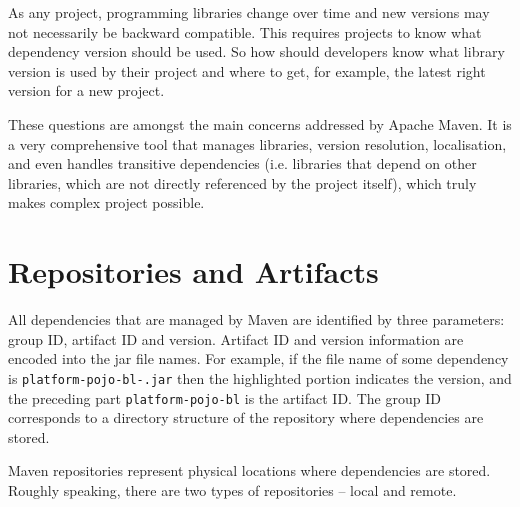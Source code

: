   As any project, programming libraries change over time and new versions may not necessarily be backward compatible.
  This requires projects to know what dependency version should be used.
  So how should developers know what library version is used by their project and where to get, for example, the latest right version for a new project.

  These questions are amongst the main concerns addressed by Apache Maven.
  It is a very comprehensive tool that manages libraries, version resolution, localisation, and even handles transitive dependencies (i.e. libraries that depend on other libraries, which are not directly referenced by the project itself), which truly makes complex project possible.

  \section{Repositories and Artifacts}
  All dependencies that are managed by Maven are identified by three parameters: group ID, artifact ID and version.
  Artifact ID and version information are encoded into the jar file names.
  For example, if the file name of some dependency is \texttt{platform-pojo-bl-.jar} then the highlighted portion \texttt{} indicates the version, and the preceding part \texttt{platform-pojo-bl} is the artifact ID.
  The group ID corresponds to a directory structure of the repository where dependencies are stored.

  Maven repositories represent physical locations where dependencies are stored.
  Roughly speaking, there are two types of repositories -- local and remote.
  

